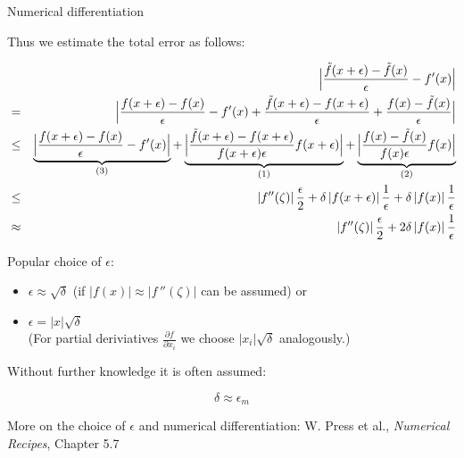 \begin{vbframe}{Numerical differentiation}
\begin{footnotesize}
  Thus we estimate the total error as follows:
  
  \begin{eqnarray*}
  && \Bigl|\frac{\tilde f(x+\epsilon) - \tilde f(x)}{\epsilon} - f\!\,'(x) \Bigr| \\ &=&  \Bigl|\frac{f(x+\epsilon) - f(x)}{\epsilon} - f'(x) + \frac{\tilde f(x+\epsilon) - f(x + \epsilon)}{\epsilon} + \frac{f(x) - \tilde f(x)}{\epsilon}\Bigr| \\
  &\le&  \underbrace{\Bigl|\frac{f(x+\epsilon) - f(x)}{\epsilon} - f'(x)\Bigr|}_{(3)} + \underbrace{\Bigl|\frac{\tilde f(x+\epsilon) - f(x + \epsilon)}{f(x + \epsilon)\epsilon} f(x + \epsilon)\Bigr|}_{(1)} + \underbrace{\Bigl|\frac{f(x) - \tilde f(x)}{f(x)\epsilon} f(x)\Bigr|}_{(2)} \\
  &\le& \left| f\!\,''(\zeta)\right|\frac{\epsilon}{2} + \delta\left| f(x + \epsilon) \right|\frac 1\epsilon + \delta\left| f(x) \right|\frac 1\epsilon \\
  &\approx& \left| f\!\,''(\zeta)\right|\frac{\epsilon}{2} + 2 \delta\left| f(x)
  \right|\frac 1\epsilon \\
  \end{eqnarray*}
  
  \end{footnotesize}
  
  \framebreak
  
  Popular choice of $\epsilon$:
  
  \begin{itemize}
  \item $\epsilon \approx \sqrt{\delta}$ (if $\left|f(x)\right| \approx \left|
  f\!\,''(\zeta)\right|$ can be assumed) or
  \item $\epsilon = \left|x\right|\sqrt{\delta}$ \\
  (For partial deriviatives $\frac{\partial f}{\partial x_i}$ we choose 
  $\left|x_i\right|\sqrt{\delta}$ analogously.)
  \end{itemize}
  
  
  Without further knowledge it is often assumed:
  
  $$
  \delta \approx \epsilon_m
  $$
  
  \lz
  
  \begin{footnotesize}
  More on the choice of $\epsilon$ and numerical differentiation: W. Press et al., \emph{Numerical Recipes}, Chapter 5.7
  \end{footnotesize}
  
  

\end{vbframe}
